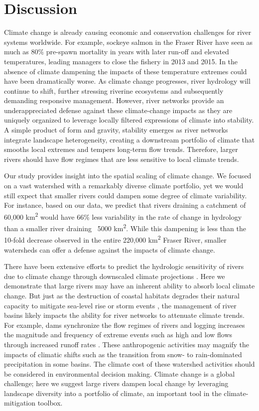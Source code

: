 \documentclass[9pt,twocolumn,twoside,lineno]{pnas-new}
\begin{document}
\section*{Discussion}
Climate change is already causing economic and conservation challenges for river systems worldwide\cite{Palmer:2009}. For example, sockeye salmon in the Fraser River have seen as much as 80\% pre-spawn mortality in years with later run-off and elevated temperatures, leading managers to close the fishery in 2013 and 2015. In the absence of climate dampening the impacts of these temperature extremes could have been dramatically worse. As climate change progresses, river hydrology will continue to shift, further stressing riverine ecosystems and subsequently demanding responsive management. However, river networks provide an underappreciated defense against these climate-change impacts as they are uniquely organized to leverage locally filtered expressions of climate into stability. A simple product of form and gravity, stability emerges as river networks integrate landscape heterogeneity, creating a downstream portfolio of climate that smooths local extremes and tempers long-term flow trends. Therefore, larger rivers should have flow regimes that are less sensitive to local climate trends.

Our study provides insight into the spatial scaling of climate change. We focused on a vast watershed with a remarkably diverse climate portfolio, yet we would still expect that smaller rivers could dampen some degree of climate variability. For instance, based on our data, we predict that rivers draining a catchment of 60,000 km\textsuperscript{2} would have 66\% less variability in the rate of change in hydrology than a smaller river draining ~5000 km\textsuperscript{2}. While this dampening is less than the 10-fold decrease observed in the entire 220,000 km\textsuperscript{2} Fraser River, smaller watersheds can offer a defense against the impacts of climate change.

There have been extensive efforts to predict the hydrologic sensitivity of rivers due to climate change through downscaled climate projections \cite{Nijssen:2001}. Here we demonstrate that large rivers may have an inherent ability to absorb local climate change. But just as the destruction of coastal habitats degrades their natural capacity to mitigate sea-level rise or storm events \cite{Arkema:2013}, the management of river basins likely impacts the ability for river networks to attenuate climate trends. For example, dams synchronize the flow regimes of rivers \cite{Poff:2007} and logging increases the magnitude and frequency of extreme events such as high and low flows through increased runoff rates \cite{Zhang:2014}. These anthropogenic activities may magnify the impacts of climatic shifts such as the transition from snow- to rain-dominated precipitation in some basins. The climate cost of these watershed activities should be considered in environmental decision making. Climate change is a global challenge; here we suggest large rivers dampen local change by leveraging landscape diversity into a portfolio of climate, an important tool in the climate-mitigation toolbox.
\end{document}
